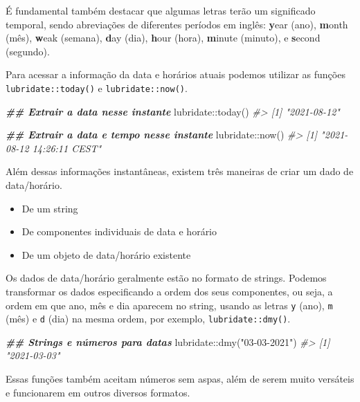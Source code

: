 \documentclass[
]{book}
\newenvironment{Shaded}{\begin{snugshade}}{\end{snugshade}}
\newcommand{\CommentTok}[1]{\textcolor[rgb]{0.37,0.37,0.37}{\textit{#1}}}
\newcommand{\DocumentationTok}[1]{\textcolor[rgb]{0.37,0.37,0.37}{\textbf{\textit{#1}}}}
\newcommand{\FunctionTok}[1]{\textcolor[rgb]{0,0,0}{#1}}
\newcommand{\NormalTok}[1]{#1}
\newcommand{\SpecialCharTok}[1]{\textcolor[rgb]{0,0,0}{#1}}
\newcommand{\StringTok}[1]{\textcolor[rgb]{0.5,0.5,0.5}{#1}}
\providecommand{\tightlist}{%
  \setlength{\itemsep}{0pt}\setlength{\parskip}{0pt}}
\begin{document}
É fundamental também destacar que algumas letras terão um significado temporal, sendo abreviações de diferentes períodos em inglês: \textbf{y}ear (ano), \textbf{m}onth (mês), \textbf{w}eak (semana), \textbf{d}ay (dia), \textbf{h}our (hora), \textbf{m}inute (minuto), e \textbf{s}econd (segundo).

Para acessar a informação da data e horários atuais podemos utilizar as funções \texttt{lubridate::today()} e \texttt{lubridate::now()}.

\begin{Shaded}
\begin{Highlighting}[]
\DocumentationTok{\#\# Extrair a data nesse instante}
\NormalTok{lubridate}\SpecialCharTok{::}\FunctionTok{today}\NormalTok{()}
\CommentTok{\#\textgreater{} [1] "2021{-}08{-}12"}

\DocumentationTok{\#\# Extrair a data e tempo nesse instante}
\NormalTok{lubridate}\SpecialCharTok{::}\FunctionTok{now}\NormalTok{()}
\CommentTok{\#\textgreater{} [1] "2021{-}08{-}12 14:26:11 CEST"}
\end{Highlighting}
\end{Shaded}

Além dessas informações instantâneas, existem três maneiras de criar um dado de data/horário.

\begin{itemize}
\tightlist
\item
  De um string
\item
  De componentes individuais de data e horário
\item
  De um objeto de data/horário existente
\end{itemize}

Os dados de data/horário geralmente estão no formato de strings. Podemos transformar os dados especificando a ordem dos seus componentes, ou seja, a ordem em que ano, mês e dia aparecem no string, usando as letras \texttt{y} (ano), \texttt{m} (mês) e \texttt{d} (dia) na mesma ordem, por exemplo, \texttt{lubridate::dmy()}.

\begin{Shaded}
\begin{Highlighting}[]
\DocumentationTok{\#\# Strings e números para datas}
\NormalTok{lubridate}\SpecialCharTok{::}\FunctionTok{dmy}\NormalTok{(}\StringTok{"03{-}03{-}2021"}\NormalTok{)}
\CommentTok{\#\textgreater{} [1] "2021{-}03{-}03"}
\end{Highlighting}
\end{Shaded}

Essas funções também aceitam números sem aspas, além de serem muito versáteis e funcionarem em outros diversos formatos.
\end{document}
